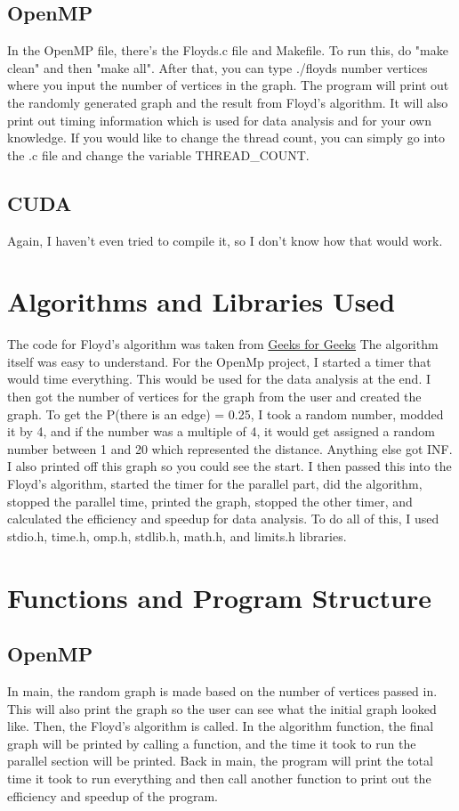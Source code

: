 \documentclass{article}
\begin{document}
\subsection{OpenMP}
In the OpenMP file, there's the Floyds.c file and Makefile. To run this, do "make clean" and then "make all". After that,  you can type ./floyds {number vertices} where you input the number of vertices in the graph. The program will print out the randomly generated graph and the result from Floyd's algorithm. It will also print out timing information which is used for data analysis and for your own knowledge. If you would like to change the thread count, you can simply go into the .c file and change the variable THREAD\_COUNT.
\subsection{CUDA}
Again, I haven't even tried to compile it, so I don't know how that would work.

\section{Algorithms and Libraries Used}
The code for Floyd's algorithm was taken from \href{https://www.geeksforgeeks.org/floyd-warshall-algorithm-dp-16/ }{Geeks for Geeks} The algorithm itself was easy to understand. 
For the OpenMp project, I started a timer that would time everything. This would be used for the data analysis at the end. I then got the number of vertices for the graph from the user and created the graph. To get the P(there is an edge) = 0.25, I took a random number, modded it by 4, and if the number was a multiple of 4, it would get assigned a random number between 1 and 20 which represented the distance. Anything else got INF. I also printed off this graph so you could see the start. I then passed this into the Floyd's algorithm, started the timer for the parallel part, did the algorithm, stopped the parallel time, printed the graph, stopped the other timer, and calculated the efficiency and speedup for data analysis. To do all of this, I used stdio.h, time.h, omp.h, stdlib.h, math.h, and limits.h libraries. 


\section {Functions and Program Structure}
\subsection{OpenMP}
In main, the random graph is made based on the number of vertices passed in. This will also print the graph so the user can see what the initial graph looked like. Then, the Floyd's algorithm is called. In the algorithm function, the final graph will be printed by calling a function, and the time it took to run the parallel section will be printed. Back in main, the program will print the total time it took to run everything and then call another function to print out the efficiency and speedup of the program.
\end{document}
